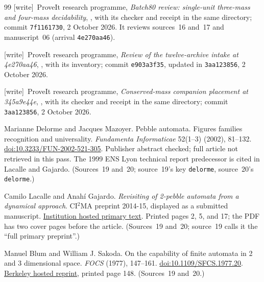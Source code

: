 \documentclass[11pt,letterpaper]{article}
\numberwithin{equation}{section}
\theoremstyle{definition}
\theoremstyle{remark}
\newcommand{\wtag}{\textup{[write]}}
\begin{document}
\begin{thebibliography}{99}
\wtag\ ProveIt research programme, \emph{Batch80 review: single-unit three-mass and four-mass decidability}, , with its checker and receipt in the same directory; commit \texttt{7f1161730}, 2 October 2026. It reviews sources~16 and~17 and manuscript~06 (arrival \texttt{4e270aa46}).

\wtag\ ProveIt research programme, \emph{Review of the twelve-archive intake at 4e270aa46}, , with its inventory; commit \texttt{e903a3f35}, updated in \texttt{3aa123856}, 2 October 2026.

\wtag\ ProveIt research programme, \emph{Conserved-mass companion placement at 345a9e44e}, , with its checker and receipt in the same directory; commit \texttt{3aa123856}, 2 October 2026.

Marianne Delorme and Jacques Mazoyer. Pebble automata. Figures families recognition and universality. \emph{Fundamenta Informaticae} 52(1--3) (2002), 81--132. \href{https://doi.org/10.3233/FUN-2002-521-305}{doi:10.3233/FUN-2002-521-305}. Publisher abstract checked; full article not retrieved in this pass. The 1999 ENS Lyon technical report predecessor is cited in Lacalle and Gajardo.
(Sources~19 and~20; source~19's key \texttt{delorme}, source~20's \texttt{delorme}.)

Camilo Lacalle and Anah\'{i} Gajardo. \emph{Revisiting of 2-pebble automata from a dynamical approach}. CI$^2$MA preprint 2014-15, displayed as a submitted manuscript. \href{https://www.ci2ma.udec.cl/pdf/pre-publicaciones2/2014/pp14-15.pdf}{Institution hosted primary text}. Printed pages 2, 5, and 17; the PDF has two cover pages before the article.
(Sources~19 and~20; source~19 calls it the ``full primary preprint''.)

Manuel Blum and William J. Sakoda. On the capability of finite automata in 2 and 3 dimensional space. \emph{FOCS} (1977), 147--161. \href{https://doi.org/10.1109/SFCS.1977.20}{doi:10.1109/SFCS.1977.20}. \href{https://www2.eecs.berkeley.edu/Pubs/TechRpts/1978/ERL-m-78-35.pdf}{Berkeley hosted reprint}, printed page 148.
(Sources~19 and~20.)


\end{thebibliography}
\end{document}
